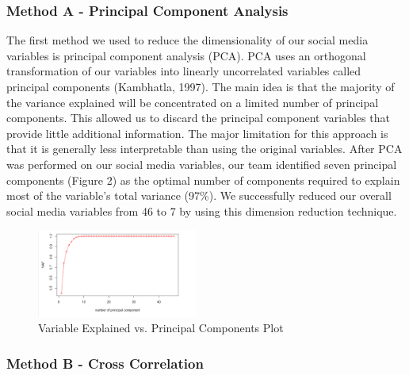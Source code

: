 \documentclass[12pt,oneside]{chicagocapstone}
\begin{document}
\hypertarget{method-a---principal-component-analysis}{%
\subsubsection*{Method A - Principal Component Analysis}\label{method-a---principal-component-analysis}}

The first method we used to reduce the dimensionality of our social media variables is principal component analysis (PCA). PCA uses an orthogonal transformation of our variables into linearly uncorrelated variables called principal components (Kambhatla, 1997). The main idea is that the majority of the variance explained will be concentrated on a limited number of principal components. This allowed us to discard the principal component variables that provide little additional information. The major limitation for this approach is that it is generally less interpretable than using the original variables.
After PCA was performed on our social media variables, our team identified seven principal components (Figure 2) as the optimal number of components required to explain most of the variable's total variance (97\%). We successfully reduced our overall social media variables from 46 to 7 by using this dimension reduction technique.
\begin{figure}

{\centering \includegraphics[width=200px,angle = 0, scale=2.1]{figure/pca} 

}

\caption{Variable Explained vs. Principal Components Plot}\label{fig:pca}
\end{figure}
\hypertarget{method-b---cross-correlation}{%
\subsubsection*{Method B - Cross Correlation}\label{method-b---cross-correlation}}
\end{document}

